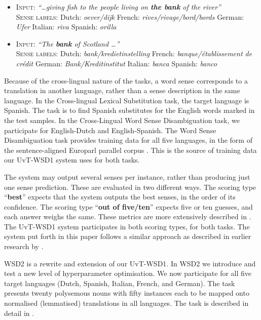 \begin{itemize}
  \item
      \textsc{Input:} \emph{“\ldots giving fish to the people living on \textbf{the bank} of the river”} \\
      \textsc{Sense labels:}
 \subitem Dutch: \emph{oever/dijk}
 \subitem French: \emph{rives/rivage/bord/bords}
 \subitem German: \emph{Ufer}
 \subitem Italian: \emph{riva}
 \subitem Spanish: \emph{orilla}
  \item
      \textsc{Input:} \emph{“The \textbf{bank} of Scotland \ldots”} \\
      \textsc{Sense labels:}
 \subitem Dutch: \emph{bank/kredietinstelling}
 \subitem French: \emph{banque/établissement de crédit}
 \subitem German: \emph{Bank/Kreditinstitut}
 \subitem Italian: \emph{banca}
 \subitem Spanish: \emph{banco}
\end{itemize}

Because of the cross-lingual nature of the tasks, a word sense corresponds to a
translation in another language, rather than a sense description in the same
language. In the Cross-lingual Lexical Substitution task, the target language
is Spanish. The task is to find Spanish substitutes for the English words
marked in the test samples. In the Cross-Lingual Word Sense Disambiguation
task, we participate for English-Dutch and English-Spanish. The Word Sense
Disambiguation task provides training data for all five languages, in the form
of the sentence-aligned Europarl parallel corpus \citep{EUROPARL}. This is the
source of training data our UvT-WSD1 system uses for both tasks.

The system may output several senses per instance, rather than producing just
one sense prediction. These are evaluated in two different ways. The scoring
type ``\textbf{best}'' expects that the system outputs the best senses, in the
order of its confidence. The scoring type ``\textbf{out of five/ten}'' expects
five or ten guesses, and each answer weighs the same. These metrics are more
extensively described in \cite{CLLS}. The UvT-WSD1 system participates in both
scoring types, for both tasks. The system put forth in this paper follows a
similar approach as described in earlier research by \cite{Hoste+02}.

WSD2 is a rewrite and extension of our UvT-WSD1. In WSD2 we introduce and test
a new level of hyperparameter optimisation. We now participate for all five
target languages (Dutch, Spanish, Italian, French, and German). The task
presents twenty polysemous nouns with fifty instances each to be mapped onto
normalised (lemmatised) translations in all languages. The task is described in
detail in \cite{CLWSD2013TASKPAPER}.

